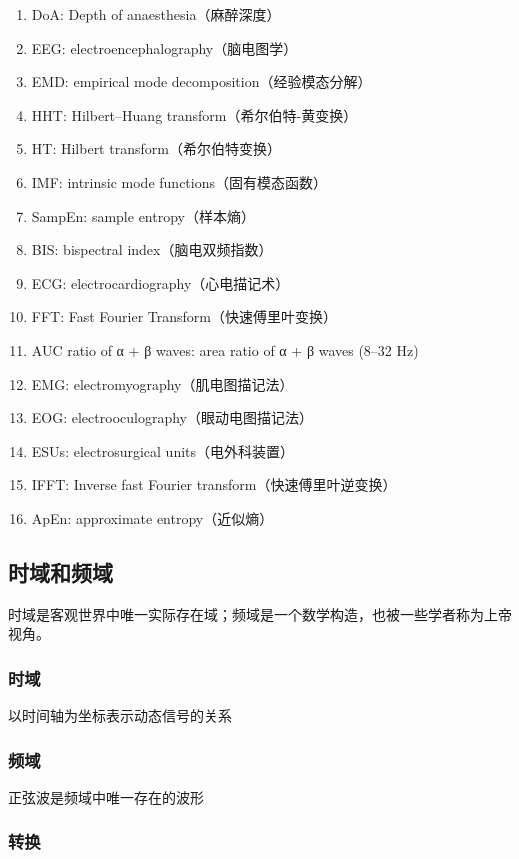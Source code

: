\documentclass[cs4size,a4paper]{ctexart}
\numberwithin{equation}{section}
\numberwithin{table}{section}
\numberwithin{figure}{section}
\begin{document}
\begin{enumerate} 
    \item DoA: Depth of anaesthesia（麻醉深度）
    \item EEG: electroencephalography（脑电图学）
    \item EMD: empirical mode decomposition（经验模态分解）
    \item HHT: Hilbert–Huang transform（希尔伯特-黄变换）
    \item HT: Hilbert transform（希尔伯特变换）
    \item IMF: intrinsic mode functions（固有模态函数）
    \item SampEn: sample entropy（样本熵）
    \item BIS: bispectral index（脑电双频指数）
    \item ECG: electrocardiography（心电描记术）
    \item FFT: Fast Fourier Transform（快速傅里叶变换）
    \item AUC ratio of α + β waves: area ratio of α + β waves (8–32 Hz) 
    \item EMG: electromyography（肌电图描记法）
    \item EOG: electrooculography（眼动电图描记法）
    \item ESUs: electrosurgical units（电外科装置）
    \item IFFT: Inverse fast Fourier transform（快速傅里叶逆变换）
    \item ApEn: approximate entropy（近似熵）
\end{enumerate}

\subsection{时域和频域}

时域是客观世界中唯一实际存在域；频域是一个数学构造，也被一些学者称为上帝视角。

\subsubsection{时域}

以时间轴为坐标表示动态信号的关系

\subsubsection{频域}

正弦波是频域中唯一存在的波形

\subsubsection{转换}
\end{document}
